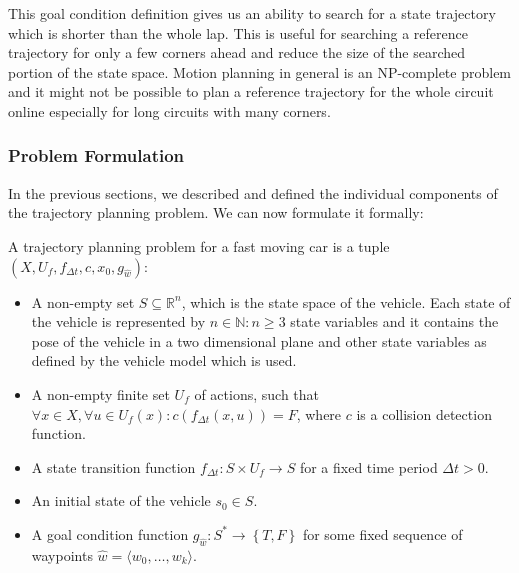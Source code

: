 This goal condition definition gives us an ability to search for a state trajectory which is shorter than the whole lap. This is useful for searching a reference trajectory for only a few corners ahead and reduce the size of the searched portion of the state space. Motion planning in general is an NP-complete problem \cite[Section~6.5]{lavalle_2006} and it might not be possible to plan a reference trajectory for the whole circuit online especially for long circuits with many corners.



\subsubsection{Problem Formulation}

In the previous sections, we described and defined the individual components of the trajectory planning problem. We can now formulate it formally:

\begin{defn}

	A trajectory planning problem for a fast moving car is a tuple $\left(X, U_f, f_{\Delta t}, c, x_0, g_{\hat{w}}\right)$:

	\begin{itemize}
		\item A non-empty set $S\subseteq\mathbb{R}^n$, which is the state space of the vehicle. Each state of the vehicle is represented by $n\in\mathbb{N}:n\geq3$ state variables and it contains the pose of the vehicle in a two dimensional plane and other state variables as defined by the vehicle model which is used.

		\item A non-empty finite set $U_f$ of actions, such that $\forall x\in X, \forall u\in U_f(x): c(f_{\Delta t}(x, u)) = F$, where $c$ is a collision detection function.

		\item A state transition function $f_{\Delta t}:S\times U_f \rightarrow S$ for a fixed time period $\Delta t>0$.
		
		\item An initial state of the vehicle $s_0 \in S$.

		\item A goal condition function $g_{\hat{w}}: S^* \rightarrow \left\{ T, F\right\}$ for some fixed sequence of waypoints $\hat{w}=\langle w_0, \ldots, w_k \rangle$.
	\end{itemize}
\end{defn}

